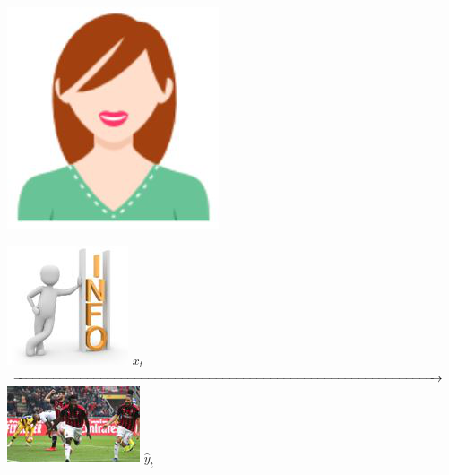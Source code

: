 \documentclass[landscape,a0a,final]{a0poster}
\begin{document}
\begin{multicols}{3}
\begin{minipage}{0.35\linewidth}
\begin{minipage}{0.35\linewidth}
\includegraphics[width=\linewidth]{figures/user.png}
\end{minipage}
\begin{minipage}{0.3\linewidth}
\centering
\vspace{4.5cm}
\includegraphics[width=0.5\linewidth]{figures/info.png} $x_t$
\\
\vspace{-0.3cm}
$\xrightarrow{\hspace*{\linewidth}}$
\\
\includegraphics[width=0.5\linewidth]{figures/action.png} $\widehat{y}_t$

\end{minipage}
\end{minipage}
\end{multicols}
\end{document}
